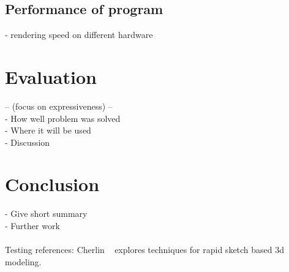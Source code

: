 \documentclass[a4paper,10pt]{article}
\begin{document}
\subsection{Performance of program}
- rendering speed on different hardware

\section{Evaluation}
 -- (focus on expressiveness) -- \\
- How well problem was solved\\
- Where it will be used \\
- Discussion

\section{Conclusion}
- Give short summary\\
- Further work\\
\\


Testing references: Cherlin ~\cite{Cherlin:2005:SMF:1090122.1090145} explores techniques for rapid sketch based 3d modeling.


{}

\end{document}
